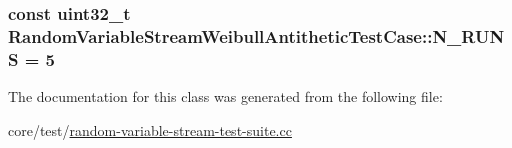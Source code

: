 \subsubsection[{\texorpdfstring{N\+\_\+\+R\+U\+NS}{N_RUNS}}]{\setlength{\rightskip}{0pt plus 5cm}const uint32\+\_\+t Random\+Variable\+Stream\+Weibull\+Antithetic\+Test\+Case\+::\+N\+\_\+\+R\+U\+NS = 5\hspace{0.3cm}{\ttfamily [static]}}\hypertarget{classRandomVariableStreamWeibullAntitheticTestCase_ac17120f5eedf02035d6cf81715df2e77}{}\label{classRandomVariableStreamWeibullAntitheticTestCase_ac17120f5eedf02035d6cf81715df2e77}


The documentation for this class was generated from the following file\+:\begin{DoxyCompactItemize}
\item 
core/test/\hyperlink{random-variable-stream-test-suite_8cc}{random-\/variable-\/stream-\/test-\/suite.\+cc}\end{DoxyCompactItemize}
